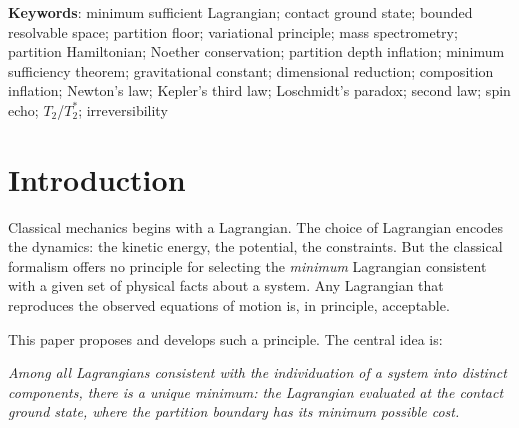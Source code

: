 \documentclass[11pt,twocolumn,a4paper]{article}
\theoremstyle{plain}
\theoremstyle{definition}
\theoremstyle{remark}
\begin{document}
\begin{abstract}
We apply the framework to mass spectrometry, where the four standard analyser
equations --- time-of-flight (TOF), Orbitrap, Fourier-transform ion cyclotron
resonance (FT-ICR), and quadrupole --- are shown to be partition depth
inflations of a single contact-ground-state Lagrangian, related by CODATA
values with zero free parameters. The universal contact constant
$K = 588.016$~Cs-133 hyperfine cycles per Orbitrap cycle per $\sqrt{\mathrm{u}}$
is the coupling between the Cs-133 partition rate and the Orbitrap contact
potential, derivable from fundamental constants alone. The paper contains
no self-citations.

\end{abstract}

\vspace{1em}
\noindent\textbf{Keywords}: minimum sufficient Lagrangian; contact ground state;
bounded resolvable space; partition floor; variational principle; mass
spectrometry; partition Hamiltonian; Noether conservation; partition depth
inflation; minimum sufficiency theorem; gravitational constant; dimensional
reduction; composition inflation; Newton's law; Kepler's third law; Loschmidt's
paradox; second law; spin echo; $T_2$/$T_2^*$; irreversibility

\tableofcontents
\newpage

\section{Introduction}
\label{sec:introduction}

Classical mechanics begins with a Lagrangian. The choice of Lagrangian encodes
the dynamics: the kinetic energy, the potential, the constraints. But the
classical formalism offers no principle for selecting the \emph{minimum}
Lagrangian consistent with a given set of physical facts about a system. Any
Lagrangian that reproduces the observed equations of motion is, in principle,
acceptable.

This paper proposes and develops such a principle. The central idea is:

\begin{center}
\emph{Among all Lagrangians consistent with the individuation of a system into
distinct components, there is a unique minimum: the Lagrangian evaluated at the
contact ground state, where the partition boundary has its minimum possible
cost.}
\end{center}
\end{document}
